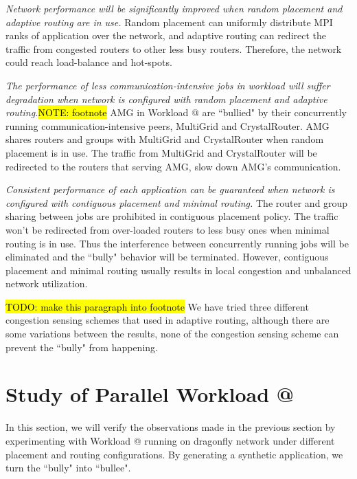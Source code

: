 \documentclass[conference,compsoc]{IEEEtran}
\makeatletter
\newcommand{\TODO}[1]{\hl{TODO: #1}}
\newcommand{\NOTE}[1]{\hl {NOTE: #1}}
\newcommand{\Rmnum}[1]{\expandafter\@slowromancap\romannumeral #1@}
\makeatother
\begin{document}
\emph{Network performance will be significantly improved when random placement and adaptive routing are in use.} Random placement can uniformly distribute MPI ranks of application over the network, and adaptive routing can redirect the traffic from congested routers to other less busy routers. Therefore, the network could reach load-balance and hot-spots. 

\emph{The performance of less communication-intensive jobs in workload will suffer degradation when network is configured with random placement and adaptive routing.}\NOTE{footnote} AMG in Workload \Rmnum{1} are ``bullied" by their concurrently running communication-intensive peers, MultiGrid and CrystalRouter. AMG shares routers and groups with MultiGrid and CrystalRouter when random placement is in use. The traffic from MultiGrid and CrystalRouter will be redirected to the routers that serving AMG, slow down AMG's communication. 

\emph{Consistent performance of each application can be guaranteed when network is configured with contiguous placement and minimal routing.} The router and group sharing between jobs are prohibited in contiguous placement policy. The traffic won't be redirected from over-loaded routers to less busy ones when minimal routing is in use. Thus the interference between concurrently running jobs will be eliminated and the ``bully" behavior will be terminated. However, contiguous placement and minimal routing usually results in local congestion and unbalanced network utilization.

\TODO{make this paragraph into footnote} We have tried three different congestion sensing schemes that used in adaptive routing\cite{won-prog-adaptive}, although there are some variations between the results, none of the congestion sensing scheme can prevent the ``bully" from happening.

\section{Study of Parallel Workload \Rmnum{2 }}
\label{sec:workload-2}

In this section, we will verify the observations made in the previous section by experimenting with Workload \Rmnum{1 } running on dragonfly network under different placement and routing configurations. By generating a synthetic application, we turn the ``bully" into ``bullee". 
\end{document}
